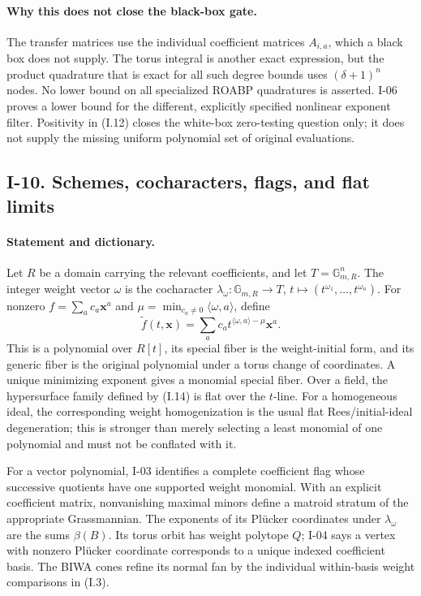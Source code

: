 \documentclass[11pt,a4paper]{article}
\theoremstyle{definition}\newtheorem{definition}{Definition}
\begin{document}
\paragraph{Why this does not close the black-box gate.}
The transfer matrices use the individual coefficient matrices
$A_{i,a}$, which a black box does not supply.  The torus integral
is another exact expression, but the product quadrature that is
exact for all such degree bounds uses $(\delta+1)^n$ nodes.
No lower bound on all specialized ROABP quadratures is asserted.
I-06 proves a lower bound for the different, explicitly specified
nonlinear exponent filter.  Positivity in (I.12) closes the
white-box zero-testing question only; it does not supply the
missing uniform polynomial set of original evaluations.

\subsection{I-10. Schemes, cocharacters, flags, and flat limits}
\label{I-10}

\paragraph{Statement and dictionary.}
Let $R$ be a domain carrying the relevant coefficients, and let
$T=\mathbb G_{m,R}^{n}$.  The integer weight vector $\omega$
is the cocharacter
$\lambda_\omega:\mathbb G_{m,R}\to T$,
$t\mapsto(t^{\omega_1},\ldots,t^{\omega_n})$.
For nonzero $f=\sum_a c_a\mathbf x^a$ and
$\mu=\min_{c_a\ne0}\langle\omega,a\rangle$, define
\[
 \widetilde f(t,\mathbf x)=
 \sum_a c_a t^{\langle\omega,a\rangle-\mu}\mathbf x^a.
\tag{I.14}
\]
This is a polynomial over $R[t]$, its special fiber is the
weight-initial form, and its generic fiber is the original
polynomial under a torus change of coordinates.  A unique
minimizing exponent gives a monomial special fiber.  Over a field,
the hypersurface family defined by (I.14) is flat over the
$t$-line.  For a homogeneous ideal, the corresponding weight
homogenization is the usual flat Rees/initial-ideal degeneration;
this is stronger than merely selecting a least monomial of one
polynomial and must not be conflated with it.

For a vector polynomial, I-03 identifies a complete coefficient
flag whose successive quotients have one supported weight
monomial.  With an explicit coefficient matrix, nonvanishing
maximal minors define a matroid stratum of the appropriate
Grassmannian.  The exponents of its Pl\"ucker coordinates under
$\lambda_\omega$ are the sums $\beta(B)$.  Its torus orbit has
weight polytope $Q$; I-04 says a vertex with nonzero Pl\"ucker
coordinate corresponds to a unique indexed coefficient basis.
The BIWA cones refine its normal fan by the individual
within-basis weight comparisons in (I.3).
\end{document}
